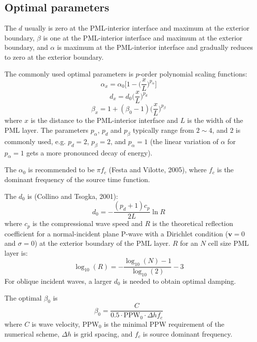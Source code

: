 \documentclass{article}
\newcommand{\mbf}[1]{\mathbf{#1}}
\begin{document}
\subsection{Optimal parameters}
The $d$ usually is zero at the PML-interior interface and maximum at the exterior boundary, $\beta$ is one at the PML-interior interface and maximum at the exterior boundary, and $\alpha$ is maximum at the PML-interior interface and gradually reduces to zero at the exterior boundary.\par
The commonly used optimal parameters is $p$-order polynomial scaling functions:
\[ \alpha_x=\alpha_0\Big[1-\Big(\frac{x}{L}\Big)^{p_\alpha}\Big] \]
\[ d_x=d_0\Big(\frac{x}{L}\Big)^{p_d} \]
\[ \beta_x=1+(\beta_0-1)\Big(\frac{x}{L}\Big)^{p_\beta} \]
where $x$ is the distance to the PML-interior interface and $L$ is the width of the PML layer. The parameters $p_\alpha$, $p_d$ and $p_\beta$ typically range from $2\sim4$, and $2$ is commonly used, e.g. $p_d=2$, $p_\beta=2$, and $p_\alpha=1$ (the linear variation of $\alpha$ for $p_\alpha=1$ gets a more pronounced decay of energy).\par
The $\alpha_0$ is recommended to be $\pi f_c$ (Festa and Vilotte, 2005), where $f_c$ is the dominant frequency of the source time function.\par
The $d_0$ is (Collino and Tsogka, 2001):
\[ d_0=-\frac{(p_d+1)c_p}{2L}\ln R \]
where $c_p$ is the compressional wave speed and $R$ is the theoretical reflection coefficient for a normal-incident plane P-wave with a Dirichlet condition ($\mbf v=0$ and $\sigma=0$) at the exterior boundary of the PML layer. $R$ for an $N$ cell size PML layer is:
\[ \log_{10}(R)=-\frac{\log_{10}(N)-1}{\log_{10}(2)}-3 \]
For oblique incident waves, a larger $d_0$ is needed to obtain optimal damping.\par
The optimal $\beta_0$ is
\[ \beta_0=\frac{C}{0.5\cdot \mathrm{PPW}_0\cdot\Delta hf_c} \]
where $C$ is wave velocity, PPW$_0$ is the minimal PPW requirement of the numerical scheme, $\Delta h$ is grid spacing, and $f_c$ is source dominant frequency.\par
\end{document}
